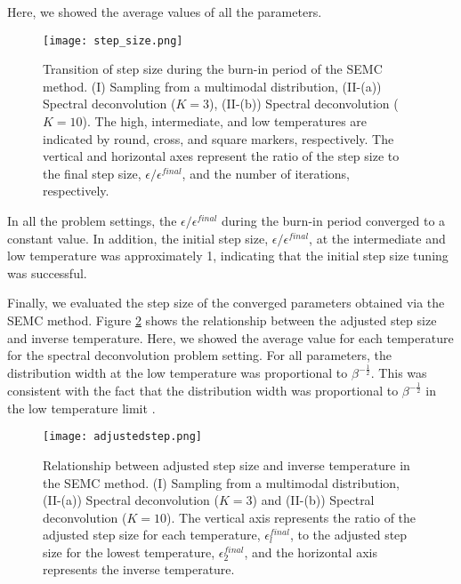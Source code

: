 \documentclass[12pt]{article}
\begin{document}
Here, we showed the average values of all the parameters.
\begin{figure}[H]
  \centering
  \texttt{[image: step\_size.png]}
  \caption{Transition of step size during the burn-in period of the SEMC method. (I) Sampling from a multimodal distribution, (II-(a)) Spectral deconvolution ($K=3$), (II-(b)) Spectral deconvolution ($K=10$). 
  The high, intermediate, and low temperatures are indicated by round, cross, and square markers, respectively. 
  The vertical and horizontal axes represent the ratio of the step size to the final step size, $\epsilon/\epsilon^{final}$, and the number of iterations, respectively.}
  \label{fig:step_size}
\end{figure}
In all the problem settings, the $\epsilon/\epsilon^{final}$ during the burn-in period converged to a constant value.
In addition, the initial step size, $\epsilon/\epsilon^{final}$, at the intermediate and low temperature was approximately 1, indicating that the initial step size tuning was successful. \par
Finally, we evaluated the step size of the converged parameters obtained via the SEMC method.
Figure \ref{fig:final_step_size} shows the relationship between the adjusted step size and inverse temperature.
Here, we showed the average value for each temperature for the spectral deconvolution problem setting.
For all parameters, the distribution width at the low temperature was proportional to $\beta^{-\frac{1}{2}}$.  
This was consistent with the fact that the distribution width was proportional to $\beta^{-\frac{1}{2}}$ in the low temperature limit \cite{iwamitsu2021replica}. 
\begin{figure}[H]
  \centering
  \texttt{[image: adjustedstep.png]}
  \caption{Relationship between adjusted step size and inverse temperature in the SEMC method. (I) Sampling from a multimodal distribution, (II-(a)) Spectral deconvolution ($K=3$) and (II-(b)) Spectral deconvolution ($K=10$). The vertical axis represents the ratio of the adjusted step size for each temperature, $\epsilon_l^{final}$, to the adjusted step size for the lowest temperature, $\epsilon_2^{final}$, and the horizontal axis represents the inverse temperature.}
  \label{fig:final_step_size}
\end{figure}
\end{document}
